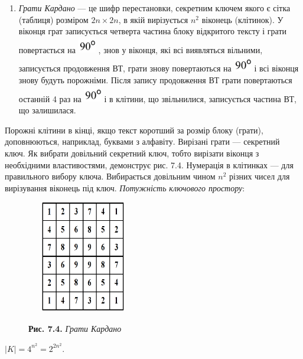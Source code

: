 \liststyleWWviiiNumxli
\setcounter{saveenum}{\value{enumi}}
\begin{enumerate}
\setcounter{enumi}{\value{saveenum}}
\item \textit{Грати Кардано} --- це шифр перестановки, секретним ключем якого є
сітка (таблиця) розміром  $2n\times 2n$,  в якій вирізується  $n^2$
віконець (клітинок). У віконця грат записується четверта частина блоку
відкритого тексту і грати повертається на 
\includegraphics[width=0.3063in,height=0.2819in]{crypt-img/crypt-img72.png} ,
знов у віконця, які всі виявляться вільними, записується продовження  ВТ, грати
знову повертаються на 
\includegraphics[width=0.3063in,height=0.2819in]{crypt-img/crypt-img73.png}  і
всі віконця  знову будуть порожніми. Після запису продовження ВТ грати
повертаються останній 4 раз на 
\includegraphics[width=0.3063in,height=0.2819in]{crypt-img/crypt-img74.png}  і
в клітини, що звільнилися, записується частина ВТ, що залишилася. 
\end{enumerate}
Порожні клітини в кінці, якщо текст коротший за розмір блоку (грати),
доповнюються, наприклад, буквами з алфавіту. Вирізані грати --- секретний ключ.
Як вибрати довільний секретний ключ, тобто вирізати віконця з необхідними
властивостями, демонструє рис. 7.4. Нумерація в клітинках --- для правильного
вибору ключа. Вибирається довільним чином  $n^2$ різних чисел для
вирізування віконець під ключ. \textit{Потужність} \textit{ключового простору}:

\begin{figure}
\centering
\begin{minipage}{}
 \includegraphics[width=1.9374in,height=1.9374in]{crypt-img/crypt-img75.png} 
\end{minipage}
\end{figure}
\begin{figure}
\centering
\begin{minipage}{2.3575in}
{\centering
\textbf{Рис. 7.4. }\textit{Грати Кардано}
\par}
\end{minipage}
\end{figure}
{\centering
 $|K|=4^{n^{{2}}}=2^{2n^2}$.
\par}

